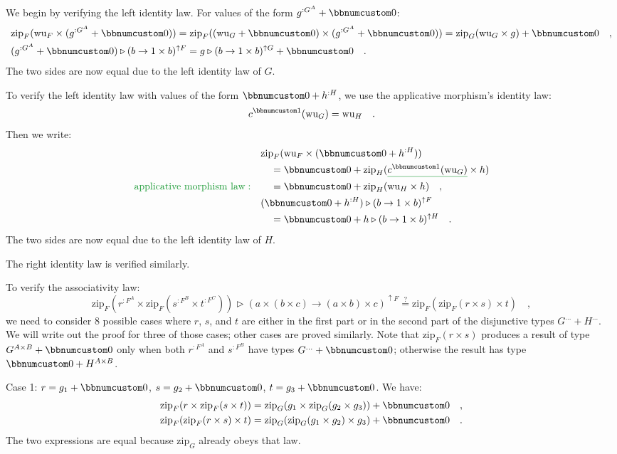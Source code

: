 We begin by verifying the left identity law. For values of the form
$g^{:G^{A}}+\bbnum 0$:
\begin{align*}
 & \text{zip}_{F}(\text{wu}_{F}\times(g^{:G^{A}}+\bbnum 0))=\text{zip}_{F}((\text{wu}_{G}+\bbnum 0)\times(g^{:G^{A}}+\bbnum 0))=\text{zip}_{G}(\text{wu}_{G}\times g)+\bbnum 0\quad,\\
 & (g^{:G^{A}}+\bbnum 0)\triangleright(b\rightarrow1\times b)^{\uparrow F}=g\triangleright(b\rightarrow1\times b)^{\uparrow G}+\bbnum 0\quad.
\end{align*}
The two sides are now equal due to the left identity law of $G$.

To verify the left identity law with values of the form $\bbnum 0+h^{:H}$,
we use the applicative morphism\textsf{'}s identity law:
\[
c^{\bbnum 1}(\text{wu}_{G})=\text{wu}_{H}\quad.
\]
Then we write:
\begin{align*}
 & \text{zip}_{F}(\text{wu}_{F}\times(\bbnum 0+h^{:H}))\\
 & \quad=\bbnum 0+\text{zip}_{H}(\gunderline{c^{\bbnum 1}(\text{wu}_{G})}\times h)\\
{\color{greenunder}\text{applicative morphism law}:}\quad & \quad=\bbnum 0+\text{zip}_{H}(\text{wu}_{H}\times h)\quad,\\
 & (\bbnum 0+h^{:H})\triangleright(b\rightarrow1\times b)^{\uparrow F}\\
 & \quad=\bbnum 0+h\triangleright(b\rightarrow1\times b)^{\uparrow H}\quad.
\end{align*}
The two sides are now equal due to the left identity law of $H$.

The right identity law is verified similarly.

To verify the associativity law:
\[
\text{zip}_{F}(r^{:F^{A}}\times\text{zip}_{F}(s^{:F^{B}}\times t^{:F^{C}}))\triangleright(a\times(b\times c)\rightarrow(a\times b)\times c)^{\uparrow F}\overset{?}{=}\text{zip}_{F}(\text{zip}_{F}(r\times s)\times t)\quad,
\]
we need to consider 8 possible cases where $r$, $s$, and $t$ are
either in the first part or in the second part of the disjunctive
types $G^{...}+H^{...}$. We will write out the proof for three of
those  cases; other cases are proved similarly. Note that $\text{zip}_{F}(r\times s)$
produces a result of type $G^{A\times B}+\bbnum 0$ only when both
$r^{:F^{A}}$ and $s^{:F^{B}}$ have types $G^{...}+\bbnum 0$; otherwise
the result has type $\bbnum 0+H^{A\times B}$.

Case 1: $r=g_{1}+\bbnum 0$, $s=g_{2}+\bbnum 0$, $t=g_{3}+\bbnum 0$.
We have:
\begin{align*}
 & \text{zip}_{F}(r\times\text{zip}_{F}(s\times t))=\text{zip}_{G}(g_{1}\times\text{zip}_{G}(g_{2}\times g_{3}))+\bbnum 0\quad,\\
 & \text{zip}_{F}(\text{zip}_{F}(r\times s)\times t)=\text{zip}_{G}(\text{zip}_{G}(g_{1}\times g_{2})\times g_{3})+\bbnum 0\quad.
\end{align*}
The two expressions are equal because $\text{zip}_{G}$ already obeys
that law.

